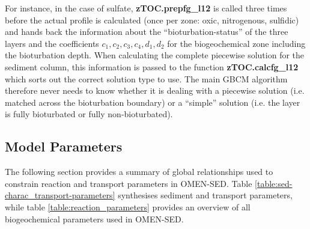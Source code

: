 \documentclass[gmd, manuscript]{copernicus}
\begin{document}
For instance, in the case of sulfate, \textsf{\textbf{zTOC.prepfg\_l12}} is called three times before the actual profile is calculated (once per zone: oxic, nitrogenous, sulfidic) 
and hands back the information about the ``bioturbation-status'' of the three layers and the coefficients $c_1, c_2, c_3, c_4, d_1, d_2$ for the biogeochemical zone including the bioturbation depth. 
When calculating the complete piecewise solution for the sediment column, this information is passed to the function \textsf{\textbf{zTOC.calcfg\_l12}} which sorts out the correct solution type to use. 
The main GBCM algorithm therefore never needs to know whether 
it is dealing with a piecewise solution (i.e. matched across the bioturbation boundary) or a ``simple'' solution (i.e. the layer is fully bioturbated or fully non-bioturbated). 


\subsection{Model Parameters}
The following section provides a summary of  global relationships used to constrain reaction and transport parameters in OMEN-SED. Table \ref{table:sed-charac_transport-parameters} synthesises sediment and transport parameters, while table \ref{table:reaction_parameters} provides an overview of all biogeochemical parameters used in OMEN-SED.
\end{document}
